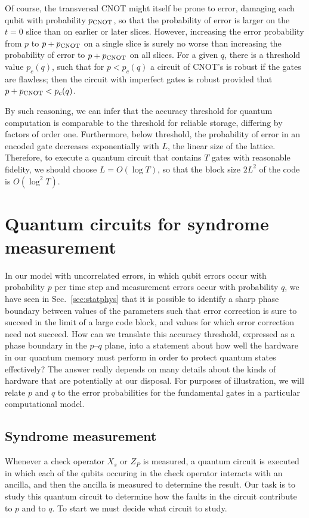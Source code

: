Of course, the transversal CNOT might itself be prone to error, damaging each qubit with probability $p_{\rm CNOT}$, so that the probability of error is larger on the $t=0$ slice than on earlier or later slices. However, increasing the error probability from $p$ to $p+p_{\rm CNOT}$ on a single slice is surely no worse than increasing the probability of error to $p+p_{\rm CNOT}$ on all slices. For a given $q$, there is a threshold value $p_c(q)$, such that for $p<p_c(q)$ a circuit of CNOT's is robust if the gates are flawless; then the circuit with imperfect gates is robust provided that $p+p_{\rm CNOT} < p_c(q)$.

By such reasoning, we can infer that the accuracy threshold for quantum computation is comparable to the threshold for reliable storage, differing by factors of order one. Furthermore, below threshold, the probability of error in an encoded gate decreases exponentially with $L$, the linear size of the lattice. Therefore, to execute a quantum circuit that contains $T$ gates with reasonable fidelity, we should choose $L=O(\log T)$, so that the block size $2L^2$ of the code is $O(\log^2 T)$.


\section{Quantum circuits for syndrome measurement}
\label{sec:storage_gates}

In our model with uncorrelated errors, in which qubit errors occur with probability $p$ per time step and measurement errors occur with probability $q$, we have seen in Sec.~\ref{sec:statphys} that it is possible to identify a sharp phase boundary between values of the parameters such that error correction is sure to succeed in the limit of a large code block, and values for which error correction need not succeed. How can we translate this accuracy threshold, expressed as a phase boundary in the $p$--$q$ plane, into a statement about how well the hardware in our quantum memory must perform in order to protect quantum states effectively? The answer really depends on many details about the kinds of hardware that are potentially at our disposal. For purposes of illustration, we will relate $p$ and $q$ to the error probabilities for the fundamental gates in a particular computational model. 

\subsection{Syndrome measurement}
Whenever a check operator $X_s$ or $Z_P$ is measured, a quantum circuit is executed in which each of the qubits occuring in the check operator interacts with an ancilla, and then the ancilla is measured to determine the result. Our task is to study this quantum circuit to determine how the faults in the circuit contribute to $p$ and to $q$. To start we must decide what circuit to study. 

